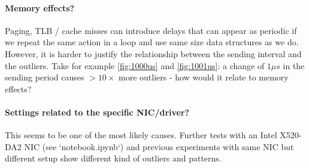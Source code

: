 \documentclass{article}
\begin{document}
\paragraph*{Memory effects?}
Paging, TLB / cache misses can introduce delays that can appear as periodic if 
we repeat the same action in a loop and use same size data structures as we do.
However, it is harder to justify the relationship between the sending interval 
and the outliers. Take for example \autoref{fig:1000us} and 
\autoref{fig:1001us}: a change of $1\mu s$ in the sending period causes
$>10\times$ more outliers - how would it relate to memory effects?

\paragraph*{Settings related to the specific NIC/driver?}
This seems to be one of the most likely causes. Further tests with an Intel X520-DA2 NIC
(see `notebook.ipynb`) and previous experiments with same NIC but different setup
show different kind of outliers and patterns. 
\end{document}
